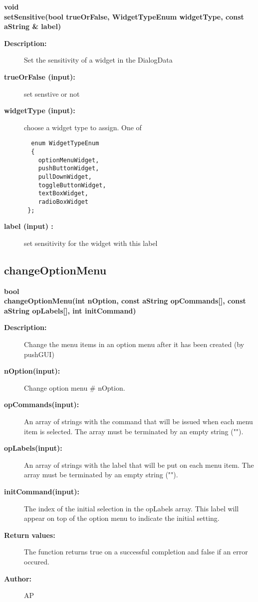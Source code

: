 \begin{flushleft} \textbf{%
void  \\ 
\settowidth{\DialogDataIncludeArgIndent}{setSensitive(}%
setSensitive(bool trueOrFalse, WidgetTypeEnum widgetType, const aString \& label)
}\end{flushleft}
\begin{description}
\item[{\bf Description:}] 
    Set the sensitivity of a widget in the DialogData
\item[{\bf trueOrFalse (input):}]  set senstive or not
\item[{\bf widgetType (input):}]  choose a widget type to assign. One of 
 \begin{verbatim}
  enum WidgetTypeEnum  
  {
    optionMenuWidget,
    pushButtonWidget,
    pullDownWidget,
    toggleButtonWidget,
    textBoxWidget,
    radioBoxWidget
 };
 \end{verbatim}
\item[{\bf label (input) :}]  set sensitivity for the widget with this label
\end{description}
\subsection{changeOptionMenu}
 
\begin{flushleft} \textbf{%
bool  \\ 
\settowidth{\DialogDataIncludeArgIndent}{changeOptionMenu(}%
changeOptionMenu(int nOption, const aString opCommands[], const aString opLabels[], int initCommand)
}\end{flushleft}
\begin{description}
\item[{\bf Description:}]  Change the menu items in an option menu after it has been created (by pushGUI)

\item[{\bf nOption(input):}]  Change option menu \# nOption.
\item[{\bf opCommands(input):}]  An array of strings with the command that will be issued when each menu
  item is selected. The array must be terminated by an empty string ("").
\item[{\bf opLabels(input):}]  An array of strings with the label that will be put on each menu
  item. The array must be terminated by an empty string ("").
\item[{\bf initCommand(input):}]  The index of the initial selection in the opLabels array. This label will
  appear on top of the option menu to indicate the initial setting.
\item[{\bf Return values:}]  The function returns true on a successful completion and false if an error occured.
\item[{\bf Author:}]  AP
\end{description}
